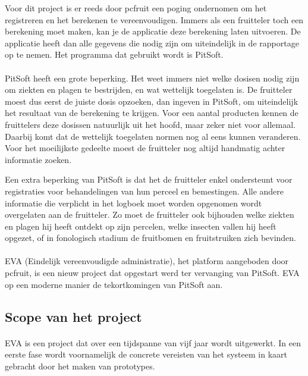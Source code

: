 Voor dit project is er reeds door pcfruit een poging ondernomen om het registreren en het
berekenen te vereenvoudigen. Immers als een fruitteler toch een berekening moet maken, kan
je de applicatie deze berekening laten uitvoeren. De applicatie heeft dan alle gegevens
die nodig zijn om uiteindelijk in de rapportage op te nemen. Het programma dat gebruikt
wordt is PitSoft.

\paragraph {} PitSoft heeft een grote beperking. Het weet immers niet welke dosisen nodig
zijn om ziekten en plagen te bestrijden, en wat wettelijk toegelaten is. De fruitteler
moest dus eerst de juiste dosis opzoeken, dan ingeven in PitSoft, om uiteindelijk het
resultaat van de berekening te krijgen. Voor een aantal producten kennen de fruittelers deze
dosissen natuurlijk uit het hoofd, maar zeker niet voor allemaal. Daarbij komt dat de
wettelijk toegelaten normen nog al eens kunnen veranderen. Voor het moeilijkste gedeelte
moest de fruitteler nog altijd handmatig achter informatie zoeken.

Een extra beperking van PitSoft is dat het de fruitteler enkel ondersteunt voor
registraties voor behandelingen van hun perceel en bemestingen. Alle andere informatie die
verplicht in het logboek moet worden opgenomen wordt overgelaten aan de fruitteler. Zo
moet de fruitteler ook bijhouden welke ziekten en plagen hij heeft ontdekt op zijn
percelen, welke insecten vallen hij heeft opgezet, of in fonologisch stadium de
fruitbomen en fruitstruiken zich bevinden.

\paragraph {} EVA (Eindelijk vereenvoudigde administratie), het platform aangeboden door
pcfruit, is een nieuw project dat opgestart werd ter vervanging van PitSoft. EVA op een
moderne manier de tekortkomingen van PitSoft aan.


\subsection {Scope van het project}

\paragraph {} EVA is een project dat over een tijdspanne van vijf jaar wordt uitgewerkt.
In een eerste fase wordt voornamelijk de concrete vereisten van het systeem in kaart
gebracht door het maken van prototypes.

